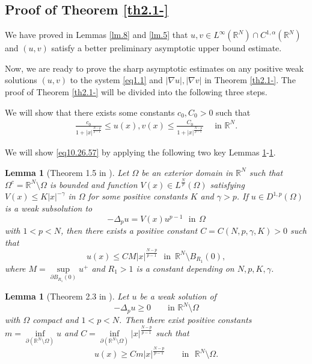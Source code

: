 \documentclass[12pt]{amsart}
\newtheorem{lem}[thm]{Lemma}
\theoremstyle{definition}
\theoremstyle{remark}
\theoremstyle{conclusion}
\theoremstyle{conjecture}
\numberwithin{equation}{section}
\newcommand{\R}{\mathbb{R}}
\begin{document}
\subsection{Proof of Theorem \ref{th2.1-}}\label{sc3.3}

We have proved in Lemmas \ref{lm.8} and \ref{lm.5} that $u, v\in L^\infty(\R^N)\cap C^{1,\alpha}(\R^N)$ and $(u,v)$ satisfy a better preliminary asymptotic upper bound estimate.

\smallskip

Now, we are ready to prove the sharp asymptotic estimates on any positive weak solutions $(u,v)$ to the system \eqref{eq1.1} and $|\nabla u|, |\nabla v|$ in Theorem \ref{th2.1-}. The proof of Theorem \ref{th2.1-} will be divided into the following three steps.

\medskip

 We will show that there exists some constants $c_0,C_0>0$ such that
\begin{align}\label{eq10.26.57}
\frac{c_0}{1+|x|^\frac{N-p}{p-1}} \leq u(x), v(x) \leq \frac{C_0}{1+|x|^\frac{N-p}{p-1}} \,\,\,\,\,\,\,\,\mbox{in}\,\,\R^N.
\end{align}

We will show \eqref{eq10.26.57} by applying the following two key Lemmas \ref{estimate1}-\ref{estimate2}.
 \begin{lem}[Theorem 1.5 in \cite{XCL}]\label{estimate1}
Let $\Omega$ be an exterior domain in $\R^N$ such that $\Omega^c=\R^N\setminus \Omega$ is bounded and
function $V(x) \in L^\frac{N}{p}(\Omega)$
satisfying $V(x) \leq K|x|^{-\gamma}$ in $\Omega$ for some positive constants $K$ and $\gamma>p$. If $u\in D^{1,p}(\Omega)$ is a weak subsolution to
$$-\Delta_p u =V(x) u^{p-1}  \,\,\,\,\mbox{in}\, \ \Omega$$
with $1<p<N$, then there exists a positive constant $C=C(N,p,\gamma,K)>0$ such that
$$ u(x)\leq C M |x|^\frac{N-p}{p-1}\,\,\,\,\mbox{in}\,\,\, \R^N\setminus B_{R_1}(0),$$
where $M = \sup\limits_{\partial B_{R_1}(0)} u^+ $ and $R_1 > 1$ is a constant depending on $N, p, K, \gamma$.
\end{lem}

\begin{lem}[Theorem 2.3 in \cite{SJZH02}]\label{estimate2}
Let $u$ be a weak solution of
$$-\Delta_p u \geq 0 \qquad \mbox{in}\,\, \R^N\setminus \Omega$$
with $\Omega$ compact and $1<p<N$. Then there exist positive constants $m = \inf\limits_{\partial (\R^N\setminus\Omega)} u$ and $C = \inf\limits_{\partial (\R^N\setminus\Omega)} |x|^\frac{N-p}{p-1}$ such that
$$ u(x)\geq C m |x|^\frac{N-p}{p-1} \qquad \mbox{in}\,\,\,\, \R^N\setminus\Omega.$$
%
\end{lem}
\end{document}
